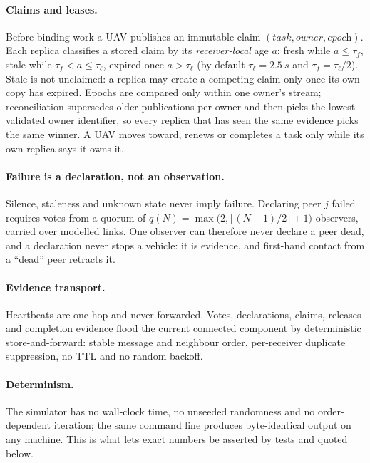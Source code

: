 \documentclass[a4paper,11pt]{article}
\begin{document}
\paragraph{Claims and leases.} Before binding work a UAV publishes an immutable
claim $(\textit{task}, \textit{owner}, \textit{epoch})$. Each replica classifies
a stored claim by its \emph{receiver-local} age $a$: fresh while
$a \le \tau_f$, stale while $\tau_f < a \le \tau_\ell$, expired once $a > \tau_\ell$
(by default $\tau_\ell = \SI{2.5}{s}$ and $\tau_f = \tau_\ell/2$). Stale is not
unclaimed: a replica may create a competing claim only once its own copy has
expired. Epochs are compared only within one owner's stream; reconciliation
supersedes older publications per owner and then picks the lowest validated
owner identifier, so every replica that has seen the same evidence picks the
same winner. A UAV moves toward, renews or completes a task only while its own
replica says it owns it.

\paragraph{Failure is a declaration, not an observation.} Silence, staleness
and unknown state never imply failure. Declaring peer $j$ failed requires votes
from a quorum of $q(N) = \max\bigl(2, \lfloor (N-1)/2 \rfloor + 1\bigr)$
observers, carried over modelled links. One observer can therefore never
declare a peer dead, and a declaration never stops a vehicle: it is evidence,
and first-hand contact from a ``dead'' peer retracts it.

\paragraph{Evidence transport.} Heartbeats are one hop and never forwarded.
Votes, declarations, claims, releases and completion evidence flood the current
connected component by deterministic store-and-forward: stable message and
neighbour order, per-receiver duplicate suppression, no TTL and no random
backoff.

\paragraph{Determinism.} The simulator has no wall-clock time, no unseeded
randomness and no order-dependent iteration; the same command line produces
byte-identical output on any machine. This is what lets exact numbers be
asserted by tests and quoted below.
\end{document}
